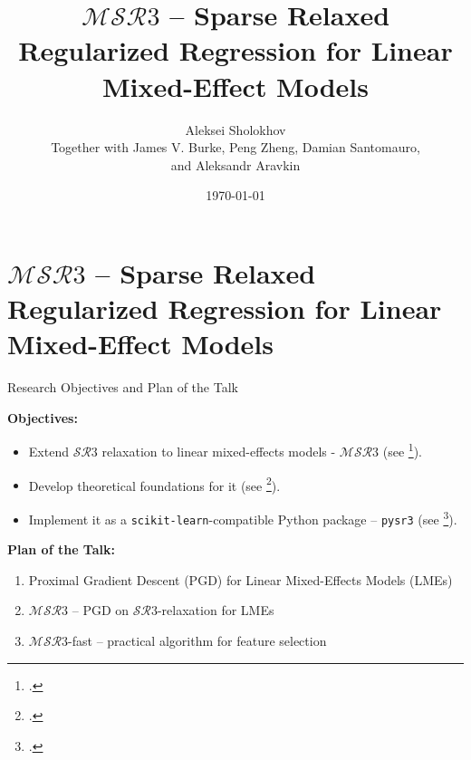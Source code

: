 \documentclass[8pt]{beamer}
\title{$\mathcal{MSR}3$ -- Sparse Relaxed Regularized Regression for Linear Mixed-Effect Models}
\date{\today}
\author{Aleksei Sholokhov \\ \vspace{1em}  Together with James V. Burke, Peng Zheng, Damian Santomauro, \\ and Aleksandr Aravkin}
\begin{document}
\maketitle


\section{$\mathcal{MSR}3$ -- Sparse Relaxed Regularized Regression for Linear Mixed-Effect Models}

\begin{frame}{Research Objectives and Plan of the Talk}
	
\textbf{Objectives:}
\begin{itemize}
	\item Extend $\mathcal{SR}3$ relaxation to linear mixed-effects models - $\mathcal{MSR}3$ (see \footcite{sholokhov2022relaxation}).
	\item Develop theoretical foundations for it (see \footcite{aravkin2022jimtheory}).
	\item Implement it as a \texttt{scikit-learn}-compatible Python package -- \texttt{pysr3} (see \footcite{sholokhov2023pysr3}).
\end{itemize}

\vspace{3em}

\textbf{Plan of the Talk:}
\begin{enumerate}
	\item Proximal Gradient Descent (PGD) for Linear Mixed-Effects Models (LMEs)
	\item $\mathcal{MSR}3$ --  PGD on $\mathcal{SR}3$-relaxation for LMEs
	\item $\mathcal{MSR}3$-fast -- practical algorithm for feature selection
\end{enumerate}
\end{frame}
\end{document}
